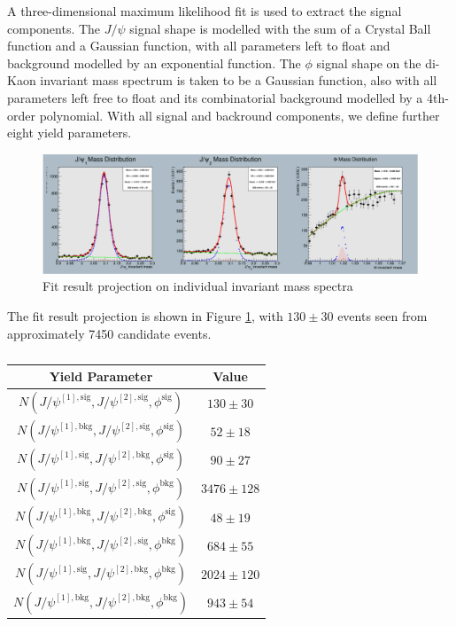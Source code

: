 \documentclass[10pt,twocolumn]{article}
\begin{document}
A three-dimensional maximum likelihood fit is used to extract the signal components. The $J/\psi$ signal shape is modelled with the sum of a Crystal Ball function and a Gaussian function, with all parameters left to float and background modelled by an exponential function. The $\phi$ signal shape on the di-Kaon invariant mass spectrum is taken to be a Gaussian function, also with all parameters left free to float and its combinatorial background modelled by a 4th-order polynomial. With all signal and backround components, we define further eight yield parameters.

\begin{figure}
    \centering
    \includegraphics[width=1.0\linewidth]{images/JpsiJpsiPhi_fit.png}
    \caption{Fit result projection on individual invariant mass spectra}
    \label{fig:JpsiJpsiPhi_fit}
\end{figure}

The fit result projection is shown in Figure  \ref{fig:JpsiJpsiPhi_fit}, with $130 \pm 30$ events seen from approximately 7450 candidate events.

\begin{table}[]
    \centering
    \caption{}
    \begin{tabular}{cc}
        \toprule
        \textbf{Yield Parameter} & \textbf{Value} \\
        \midrule
        $N(J/\psi^{[1], \text{sig} },J/\psi^{[2],\text{sig} }, \phi^\text{sig})$ & $130 \pm 30$ \\
        $N(J/\psi^{[1], \text{bkg} },J/\psi^{[2],\text{sig} }, \phi^\text{sig})$ & $52 \pm 18$ \\
        $N(J/\psi^{[1], \text{sig} },J/\psi^{[2],\text{bkg} }, \phi^\text{sig})$ & $90 \pm 27$ \\
        $N(J/\psi^{[1], \text{sig} },J/\psi^{[2],\text{sig} }, \phi^\text{bkg})$ & $3476 \pm 128$ \\
        $N(J/\psi^{[1], \text{bkg} },J/\psi^{[2],\text{bkg} }, \phi^\text{sig})$ & $48 \pm 19$ \\
        $N(J/\psi^{[1], \text{bkg} },J/\psi^{[2],\text{sig} }, \phi^\text{bkg})$ & $684 \pm 55$ \\
        $N(J/\psi^{[1], \text{sig} },J/\psi^{[2],\text{bkg} }, \phi^\text{bkg})$ & $2024 \pm 120$ \\
        $N(J/\psi^{[1], \text{bkg} },J/\psi^{[2],\text{bkg} }, \phi^\text{bkg})$ & $943 \pm 54$ \\
        \bottomrule
    \end{tabular}
    \label{tab:fitres_JpsiJpsiPhi}
\end{table}
\end{document}
